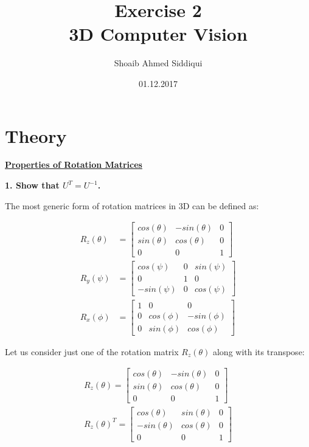 \documentclass[a4paper, twoside, english]{article}
\title{Exercise 2 \\ 3D Computer Vision}  %
\author{Shoaib Ahmed Siddiqui}                       %
\date{01.12.2017}                              %
\begin{document}
\maketitle

\section{Theory}

\underline{\textbf{Properties of Rotation Matrices}}

\textbf{1. Show that $U^{T} = U^{-1}$.}

The most generic form of rotation matrices in 3D can be defined as:

\abovedisplayskip
\begin{equation*}
\begin{align*}
 R_z (\theta) &= \left[
 \begin{array}{ccc}
  cos(\theta) & -sin(\theta) & 0 \\
  sin(\theta) & cos(\theta) & 0 \\
  0 & 0 & 1
 \end{array}
 \right] \\
 R_y (\psi) &= \left[
 \begin{array}{ccc}
  cos(\psi) & 0 & sin(\psi) \\
  0 & 1 & 0 \\
  -sin(\psi) & 0 & cos(\psi)
 \end{array}
 \right] \\
 R_x (\phi) &= \left[
 \begin{array}{ccc}
  1 & 0 & 0 \\
  0 & cos(\phi) & -sin(\phi) \\
  0 & sin(\phi) & cos(\phi)
 \end{array}
 \right]
 \label{eq:allRotationMatrices}
\end{align*}
\end{equation*}

Let us consider just one of the rotation matrix $R_z (\theta)$ along with its transpose:

\begin{align*}
 R_z (\theta) = \left[
 \begin{array}{ccc}
  cos(\theta) & -sin(\theta) & 0 \\
  sin(\theta) & cos(\theta) & 0 \\
  0 & 0 & 1
 \end{array}
 \right] \\
 R_z (\theta)^{T} = \left[
 \begin{array}{ccc}
  cos(\theta) & sin(\theta) & 0 \\
  -sin(\theta) & cos(\theta) & 0 \\
  0 & 0 & 1
 \end{array}
 \right] 
 \label{eq:rotationMatricesForZAxis}
\end{align*}
\end{document}
